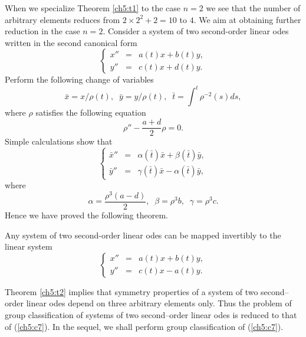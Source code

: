 When we specialize Theorem \ref{ch5:t1} to the case $n=2$ we see that the
number of arbitrary elements reduces from $2\times 2^2+2=10$ to
$4$. We aim at obtaining further reduction in the case $n=2$. Consider a
system of two second-order linear odes written in the second canonical form
\begin{equation}
\label{ch5:c4}
\left \{ \begin{array}{lll}
          x'' &=& a(t)x+b(t)y, \\
          y'' &= & c(t)x+d(t)y.
          \end{array}
          \right.
\end{equation}
Perform the following change of variables
\begin{equation}
\label{ch5:c5}
\bar x=x/\rho (t),\;\; \bar y=y/\rho (t),\;\; \bar t= \int^t \rho^{-2}(s)ds,
\end{equation}
where $\rho$ satisfies the following equation
\begin{equation}
\label{ch5:c6}
\rho ''-\frac{a+d}{2}\rho =0.
\end{equation}
Simple calculations show that
\begin{equation}
\label{ch5:c6}
\left \{ \begin{array}{lll}
        \bar x'' &=&\alpha (\bar t)\bar x+ \beta (\bar t) \bar y, \\
        \bar  y'' &= & \gamma (\bar t)\bar x -\alpha (\bar t) \bar y,
          \end{array}
          \right.
\end{equation}
where
\[ \alpha=\frac{\rho^3 (a-d)}{2},\;\;\beta=\rho^3 b,\;\;\gamma=\rho^3 c.\]
Hence we have proved the following theorem.
\begin{theo}
\label{ch5:t2}
\begin{em}
Any system of two second-order linear odes can be mapped invertibly to
the linear system
\begin{equation}
\label{ch5:c7}
\left \{ \begin{array}{lll}
          x'' &=& a(t)x+b(t)y, \\
          y'' &= & c(t)x-a(t)y.
          \end{array}
          \right.
\end{equation}
\end{em}
\end{theo}
Theorem \ref{ch5:t2} implies that symmetry properties of a system of two
second--order linear odes depend on three arbitrary elements only. Thus
the problem of group classification of systems of two second--order linear
odes is reduced to that of (\ref{ch5:c7}). In the sequel, we shall perform
group classification of (\ref{ch5:c7}).

